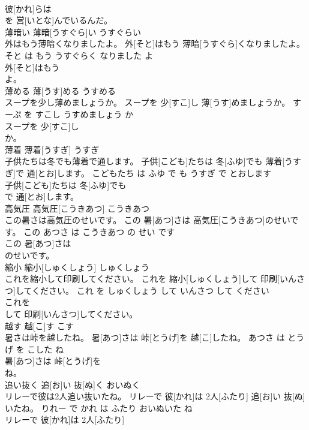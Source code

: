 \documentclass[8pt]{extreport}
\begin{document}
\begin{CJK}{UTF8}{min}
\\	彼[かれ]らは
\\	を 営[いとな]んでいるんだ。			
\\	薄暗い	薄暗[うすぐら]い	うすぐらい	
\\	外はもう薄暗くなりましたよ。	外[そと]はもう 薄暗[うすぐら]くなりましたよ。	そと は もう うすぐらく なりました よ	
\\	外[そと]はもう
\\	よ。			
\\	薄める	薄[うす]める	うすめる	
\\	スープを少し薄めましょうか。	スープを 少[すこ]し 薄[うす]めましょうか。	すーぷ を すこし うすめましょう か	
\\	スープを 少[すこ]し
\\	か。			
\\	薄着	薄着[うすぎ]	うすぎ	
\\	子供たちは冬でも薄着で通します。	子供[こども]たちは 冬[ふゆ]でも 薄着[うすぎ]で 通[とお]します。	こどもたち は ふゆ で も うすぎ で とおします	
\\	子供[こども]たちは 冬[ふゆ]でも
\\	で 通[とお]します。			
\\	高気圧	高気圧[こうきあつ]	こうきあつ	
\\	この暑さは高気圧のせいです。	この 暑[あつ]さは 高気圧[こうきあつ]のせいです。	この あつさ は こうきあつ の せい です	
\\	この 暑[あつ]さは
\\	のせいです。			
\\	縮小	縮小[しゅくしょう]	しゅくしょう	
\\	これを縮小して印刷してください。	これを 縮小[しゅくしょう]して 印刷[いんさつ]してください。	これ を しゅくしょう して いんさつ して ください	
\\	これを
\\	して 印刷[いんさつ]してください。			
\\	越す	越[こ]す	こす	
\\	暑さは峠を越したね。	暑[あつ]さは 峠[とうげ]を 越[こ]したね。	あつさ は とうげ を こした ね	
\\	暑[あつ]さは 峠[とうげ]を
\\	ね。			
\\	追い抜く	追[お]い 抜[ぬ]く	おいぬく	
\\	リレーで彼は2人追い抜いたね。	リレーで 彼[かれ]は 2人[ふたり] 追[お]い 抜[ぬ]いたね。	りれー で かれ は ふたり おいぬいた ね	
\\	リレーで 彼[かれ]は 2人[ふたり]

\end{CJK}
\end{document}
